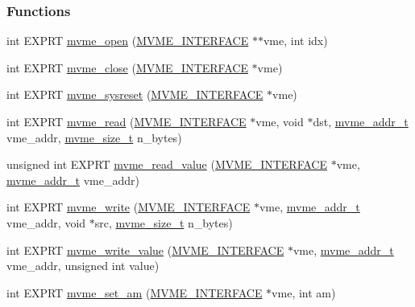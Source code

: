 \subsubsection*{Functions}
\begin{DoxyCompactItemize}
\item 
int EXPRT \hyperlink{group__mvmestdfunctionh_ga13db7fc7c7c022e46fadd8fc4dc40047}{mvme\_\-open} (\hyperlink{structMVME__INTERFACE}{MVME\_\-INTERFACE} $\ast$$\ast$vme, int idx)
\item 
int EXPRT \hyperlink{group__mvmestdfunctionh_gab4010bb5ccbba1cdfb05307479b970b5}{mvme\_\-close} (\hyperlink{structMVME__INTERFACE}{MVME\_\-INTERFACE} $\ast$vme)
\item 
int EXPRT \hyperlink{group__mvmestdfunctionh_ga176cf77674a46bbef7ec446b4344bce2}{mvme\_\-sysreset} (\hyperlink{structMVME__INTERFACE}{MVME\_\-INTERFACE} $\ast$vme)
\item 
int EXPRT \hyperlink{group__mvmestdfunctionh_ga27a06319b3078fbabea16941721d7877}{mvme\_\-read} (\hyperlink{structMVME__INTERFACE}{MVME\_\-INTERFACE} $\ast$vme, void $\ast$dst, \hyperlink{group__mvmestdinclude_ga589085bbef4f3f52d4a39a316d743e05}{mvme\_\-addr\_\-t} vme\_\-addr, \hyperlink{group__mvmestdinclude_ga01d0cfb7d3dd7f89dee14b82d6cd4c3b}{mvme\_\-size\_\-t} n\_\-bytes)
\item 
unsigned int EXPRT \hyperlink{group__mvmestdfunctionh_ga5cab05257f96039738eec34ec330e0d8}{mvme\_\-read\_\-value} (\hyperlink{structMVME__INTERFACE}{MVME\_\-INTERFACE} $\ast$vme, \hyperlink{group__mvmestdinclude_ga589085bbef4f3f52d4a39a316d743e05}{mvme\_\-addr\_\-t} vme\_\-addr)
\item 
int EXPRT \hyperlink{group__mvmestdfunctionh_gab246e52895227ad3910ac7816801a73b}{mvme\_\-write} (\hyperlink{structMVME__INTERFACE}{MVME\_\-INTERFACE} $\ast$vme, \hyperlink{group__mvmestdinclude_ga589085bbef4f3f52d4a39a316d743e05}{mvme\_\-addr\_\-t} vme\_\-addr, void $\ast$src, \hyperlink{group__mvmestdinclude_ga01d0cfb7d3dd7f89dee14b82d6cd4c3b}{mvme\_\-size\_\-t} n\_\-bytes)
\item 
int EXPRT \hyperlink{group__mvmestdfunctionh_ga901e510ac4c207e424e944ee92c5ea65}{mvme\_\-write\_\-value} (\hyperlink{structMVME__INTERFACE}{MVME\_\-INTERFACE} $\ast$vme, \hyperlink{group__mvmestdinclude_ga589085bbef4f3f52d4a39a316d743e05}{mvme\_\-addr\_\-t} vme\_\-addr, unsigned int value)
\item 
int EXPRT \hyperlink{group__mvmestdfunctionh_gaf1529ef7e75316beebc1672840217bd0}{mvme\_\-set\_\-am} (\hyperlink{structMVME__INTERFACE}{MVME\_\-INTERFACE} $\ast$vme, int am)
$$
\end{DoxyCompactItemize}
